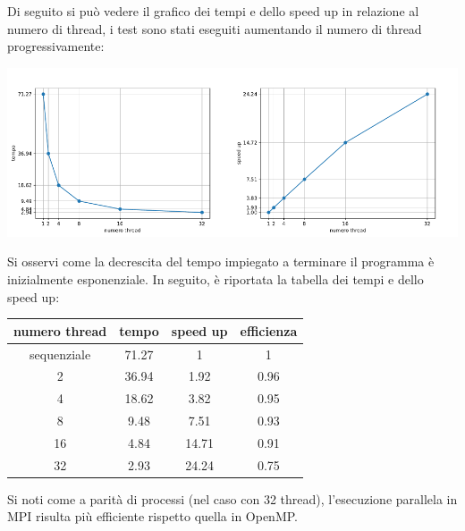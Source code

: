 \documentclass[12pt,openany]{report}
\begin{document}
Di seguito si può vedere il grafico dei tempi e dello speed up in relazione al numero di thread, i test sono stati eseguiti aumentando il numero di thread progressivamente:
\begin{center}
    \includegraphics[width=0.5\textwidth ]{images/tempi_OpenMP.pdf}\includegraphics[width=0.5\textwidth ]{images/speedup_OpenMP.pdf}
\end{center}
Si osservi come la decrescita del tempo impiegato a terminare il programma è inizialmente esponenziale. In seguito, è riportata la tabella dei tempi e dello speed up:
\begin{center}
    \begin{tabular}{|c|c|c|c|}
        \hline
        \rowcolor[HTML]{EFEFEF} 
        numero thread & tempo & speed up & efficienza\\ \hline
        sequenziale       & 71.27 & 1       & 1 \\ \hline
        2                 & 36.94 & 1.92    & 0.96 \\ \hline
        4                 & 18.62 & 3.82    & 0.95 \\ \hline
        8                 & 9.48  & 7.51    & 0.93 \\ \hline
        16                & 4.84  & 14.71   & 0.91 \\ \hline
        32                & 2.93  & 24.24   & 0.75 \\ \hline
        \end{tabular}
\end{center}
Si noti come a parità di processi (nel caso con 32 thread), l'esecuzione parallela in MPI risulta più efficiente rispetto quella in OpenMP.
\end{document}
